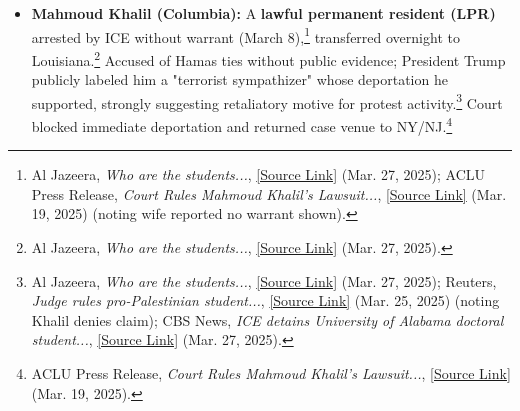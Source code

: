 \documentclass[11pt, letterpaper]{article}
\begin{document}
    \begin{itemize}
        \item \textbf{Mahmoud Khalil (Columbia):} A \textbf{lawful permanent resident (LPR)} arrested by ICE without warrant (March 8),\footnote{Al Jazeera, \emph{Who are the students...}, \href{https://www.aljazeera.com/news/2025/3/27/who-are-the-students-trump-wants-to-deport\#:~:text=On\%20March\%208\%2C\%20ICE\%20agents,kind\%20under\%20the\%20Trump\%20administration}{[Source Link]} (Mar. 27, 2025); ACLU Press Release, \emph{Court Rules Mahmoud Khalil’s Lawsuit...}, \href{https://www.aclu.org/press-releases/court-rules-mahmoud-khalils-lawsuit-challenging-his-unlawful-detention-by-ice-should-move-forward-in-new-jersey\#:~:text=Samah\%20Sisay\%2C\%20staff\%20attorney\%20at,\%E2\%80\%9D}{[Source Link]} (Mar. 19, 2025) (noting wife reported no warrant shown).} transferred overnight to Louisiana.\footnote{Al Jazeera, \emph{Who are the students...}, \href{https://www.aljazeera.com/news/2025/3/27/who-are-the-students-trump-wants-to-deport\#:~:text=McLaughlin\%20alleged\%20Khalil\%20\%E2\%80\%9Cled\%20activities,processing\%20facility\%20in\%20Jena\%2C\%20Louisiana}{[Source Link]} (Mar. 27, 2025).} Accused of Hamas ties without public evidence; President Trump publicly labeled him a "terrorist sympathizer" whose deportation he supported, strongly suggesting retaliatory motive for protest activity.\footnote{Al Jazeera, \emph{Who are the students...}, \href{https://www.aljazeera.com/news/2025/3/27/who-are-the-students-trump-wants-to-deport\#:~:text=McLaughlin\%20alleged\%20Khalil\%20\%E2\%80\%9Cled\%20activities,processing\%20facility\%20in\%20Jena\%2C\%20Louisiana}{[Source Link]} (Mar. 27, 2025); Reuters, \emph{Judge rules pro-Palestinian student...}, \href{https://www.reuters.com/legal/judge-rules-pro-palestinian-student-permanent-us-resident-cannot-be-detained-2025-03-25/\#:~:text=Columbia\%20protester\%20Mahmoud\%20Khalil\%2C\%20who,supporting\%20Hamas\%2C\%20which\%20Khalil\%20denies}{[Source Link]} (Mar. 25, 2025) (noting Khalil denies claim); CBS News, \emph{ICE detains University of Alabama doctoral student...}, \href{https://www.cbsnews.com/news/ice-detains-university-of-alabama-doctoral-student/?intcid=CNI-00-10aaa3a\#:~:text=Mahmoud\%20Khalil\%20\%27s\%20case\%20has,terrorist\%20sympathizers}{[Source Link]} (Mar. 27, 2025).} Court blocked immediate deportation and returned case venue to NY/NJ.\footnote{ACLU Press Release, \emph{Court Rules Mahmoud Khalil’s Lawsuit...}, \href{https://www.aclu.org/press-releases/court-rules-mahmoud-khalils-lawsuit-challenging-his-unlawful-detention-by-ice-should-move-forward-in-new-jersey\#:~:text=NEW\%20YORK\%20\%E2\%80\%93\%20The\%20Southern,absence\%20of\%20a\%20court\%20order}{[Source Link]} (Mar. 19, 2025).}

\end{itemize}
\end{document}
